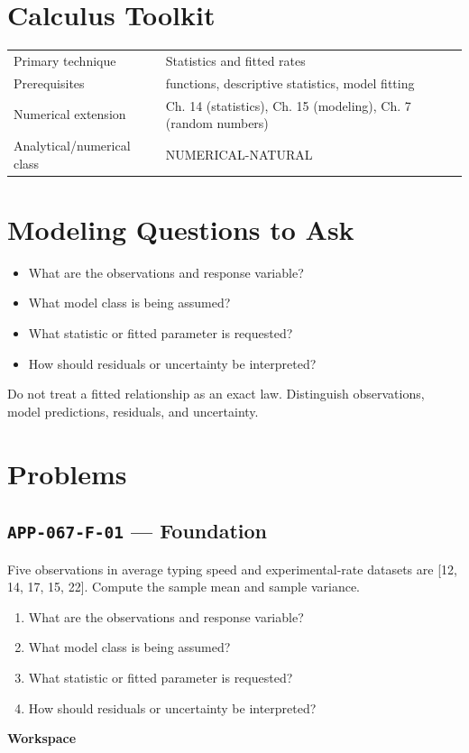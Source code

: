 \documentclass[11pt]{book}
\newcommand{\pid}[1]{\texttt{#1}}
\newcommand{\workspace}{\par\vspace{0.7in}\hrulefill\par\vspace{0.55in}\hrulefill\par}
\begin{document}
\section*{Calculus Toolkit}
\begin{tabularx}{\textwidth}{@{}lX@{}}\toprule
Primary technique & Statistics and fitted rates \\
Prerequisites & functions, descriptive statistics, model fitting \\
Numerical extension & Ch. 14 (statistics), Ch. 15 (modeling), Ch. 7 (random numbers) \\
Analytical/numerical class & NUMERICAL-NATURAL \\
\bottomrule\end{tabularx}
\section*{Modeling Questions to Ask}\begin{itemize}
\item What are the observations and response variable?
\item What model class is being assumed?
\item What statistic or fitted parameter is requested?
\item How should residuals or uncertainty be interpreted?
\end{itemize}
\begin{errorbox}Do not treat a fitted relationship as an exact law. Distinguish observations, model predictions, residuals, and uncertainty.\end{errorbox}
\section*{Problems}
\subsection*{\pid{APP-067-F-01} — Foundation}
\begin{problembox}
Five observations in average typing speed and experimental-rate datasets are [12, 14, 17, 15, 22]. Compute the sample mean and sample variance.
\end{problembox}
\begin{promptbox}\begin{enumerate}
\item What are the observations and response variable?
\item What model class is being assumed?
\item What statistic or fitted parameter is requested?
\item How should residuals or uncertainty be interpreted?
\end{enumerate}\end{promptbox}
\textbf{Workspace}\workspace
{}
\end{document}
